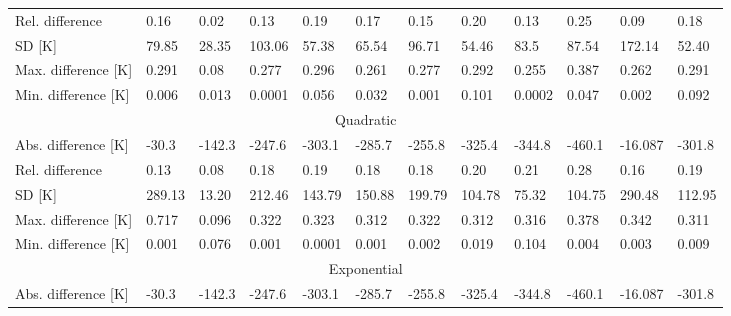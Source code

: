 \begin{table}
\begin{tabular}{llllllllllll}
        Rel. difference         & 0.16                           & 0.02                          & 0.13    & 0.19    & 0.17    & 0.15    & 0.20    & 0.13    & 0.25    & 0.09    & 0.18    \\
        SD {[}K{]}              & 79.85                          & 28.35                         & 103.06  & 57.38   & 65.54   & 96.71   & 54.46   & 83.5    & 87.54   & 172.14  & 52.40  \\
        Max. difference {[}K{]} & 0.291                          & 0.08                          & 0.277   & 0.296   & 0.261   & 0.277   & 0.292   & 0.255   & 0.387   & 0.262   & 0.291   \\
        Min. difference {[}K{]} & 0.006                          & 0.013                         & 0.0001  & 0.056   & 0.032   & 0.001   & 0.101   & 0.0002  & 0.047   & 0.002   & 0.092   \\ \hline
        \multicolumn{12}{c}{Quadratic}                                                                                                                                                 \\ \hline
        Abs. difference {[}K{]} & -30.3                          & -142.3                        & -247.6  & -303.1  & -285.7  & -255.8  & -325.4  & -344.8  & -460.1  & -16.087 & -301.8  \\
        Rel. difference         & 0.13                           & 0.08                          & 0.18    & 0.19    & 0.18    & 0.18    & 0.20    & 0.21    & 0.28    & 0.16    & 0.19    \\
        SD {[}K{]}              & 289.13                         & 13.20                         & 212.46  & 143.79  & 150.88  & 199.79  & 104.78  & 75.32   & 104.75  & 290.48  & 112.95  \\
        Max. difference {[}K{]} & 0.717                          & 0.096                         & 0.322   & 0.323   & 0.312   & 0.322   & 0.312   & 0.316   & 0.378   & 0.342   & 0.311   \\
        Min. difference {[}K{]} & 0.001                          & 0.076                         & 0.001   & 0.0001  & 0.001   & 0.002   & 0.019   & 0.104   & 0.004   & 0.003   & 0.009   \\ \hline
        \multicolumn{12}{c}{Exponential}                                                                                                                                                   \\ \hline
        Abs. difference {[}K{]} & -30.3                          & -142.3                        & -247.6  & -303.1  & -285.7  & -255.8  & -325.4  & -344.8  & -460.1  & -16.087 & -301.8  \\

\end{tabular}
\end{table}
